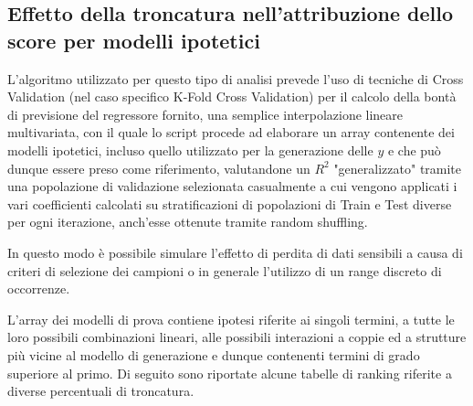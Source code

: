 \documentclass[a4paper]{report}
\begin{document}
\subsection{Effetto della troncatura nell'attribuzione dello score per modelli ipotetici}
L'algoritmo utilizzato per questo tipo di analisi prevede l'uso di tecniche di Cross Validation (nel caso specifico K-Fold Cross Validation) per il calcolo della bontà di previsione del regressore fornito,  una semplice interpolazione lineare multivariata, con il quale lo script procede ad elaborare un array contenente dei modelli ipotetici, incluso quello utilizzato per la generazione delle $y$ e che può dunque essere preso come riferimento, valutandone un $R^2$ "generalizzato" tramite una popolazione di validazione selezionata casualmente a cui vengono applicati i vari coefficienti calcolati su stratificazioni di popolazioni di Train e Test diverse per ogni iterazione, anch'esse ottenute tramite random shuffling.

In questo modo è possibile simulare l'effetto di perdita di dati sensibili a causa di criteri di selezione dei campioni o in generale l'utilizzo di un range discreto di occorrenze.

L'array dei modelli di prova contiene ipotesi riferite ai singoli termini, a tutte le loro possibili combinazioni lineari, alle possibili interazioni a coppie ed a strutture più vicine al modello di generazione e dunque contenenti termini di grado superiore al primo.
Di seguito sono riportate alcune tabelle di ranking riferite a diverse percentuali di troncatura.
\end{document}
